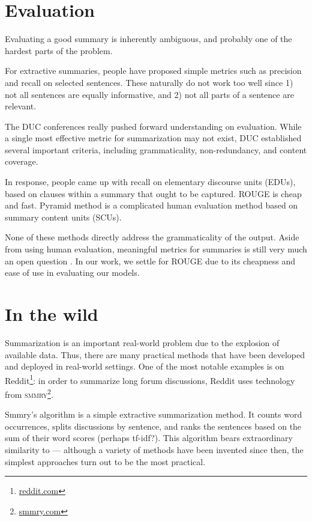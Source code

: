 \documentclass[11pt]{report}
\begin{document}
\section{Evaluation}

Evaluating a good summary is inherently ambiguous, and probably one of the hardest parts of the problem.

For extractive summaries, people have proposed simple metrics such as precision and recall on selected sentences. These naturally do not work too well since 1) not all sentences are equally informative, and 2) not all parts of a sentence are relevant.

The DUC conferences really pushed forward understanding on evaluation. While a single most effective metric for summarization may not exist, DUC established several important criteria, including grammaticality, non-redundancy, and content coverage.

In response, people came up with recall on elementary discourse units (EDUs), based on clauses within a summary that ought to be captured. ROUGE \cite{lin2004rouge} is cheap and fast. Pyramid method is a complicated human evaluation method based on summary content units (SCUs). 

None of these methods directly address the grammaticality of the output. Aside from using human evaluation, meaningful metrics for summaries is still very much an open question \citep{toutanova2016summarymetrics}. In our work, we settle for ROUGE due to its cheapness and ease of use in evaluating our models.


\section{In the wild}

Summarization is an important real-world problem due to the explosion of available data. Thus, there are many practical methods that have been developed and deployed in real-world settings. One of the most notable examples is on Reddit\footnote{\url{reddit.com}}: in order to summarize long forum discussions, Reddit uses technology from \textsc{smmry}\footnote{\url{smmry.com}}.

Smmry's algorithm is a simple extractive summarization method. It counts word occurrences, splits discussions by sentence, and ranks the sentences based on the sum of their word scores (perhaps tf-idf?). This algorithm bears extraordinary similarity to \citet{luhn1958automatic} --- although a variety of methods have been invented since then, the simplest approaches turn out to be the most practical.
\end{document}
